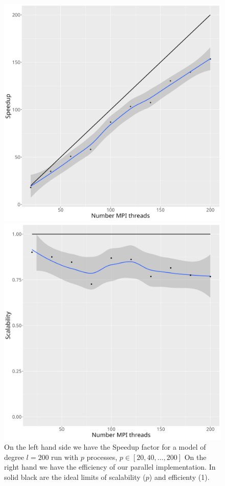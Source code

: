 \documentclass[a4paper]{article}
\theoremstyle{definition}
\begin{document}
\begin{figure}[h!]
    \centering
    \begin{minipage}{0.45\linewidth}
    \includegraphics[width=0.95\linewidth]{media/speedup_mpi_200.png}
    \end{minipage}
    \centering
    \begin{minipage}{0.45\linewidth}
    \includegraphics[width=0.95\linewidth]{media/scalability_mpi_200.png}
    \end{minipage}
    \caption{On the left hand side we have the Speedup factor for a model of degree $l = 200$ run with $p$ processes, $p \in [20, 40, \dots, 200]$
    On the right hand we have the efficiency of our parallel implementation. In solid black are the ideal limits of scalability ($p$) and 
    efficienty (1).}
\end{figure}
\end{document}
